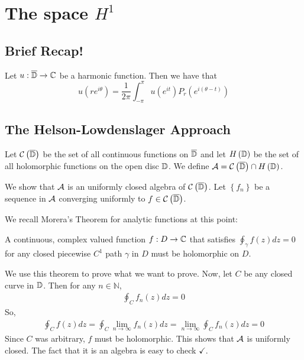 \section{The space \texorpdfstring{$H^1$}{}}
\horz

\subsection{Brief Recap!}
\begin{theorem}
    Let $u : \overline{\mathbb D} \to \mathbb C$ be a harmonic function. Then we have that
    \begin{equation*}
	u\left( re^{i\theta} \right) = \frac{1}{2\pi} \int_{-\pi}^{\pi} u\left( e^{it} \right) P_{r} \left( e^{i\left( \theta-t \right)} \right)
    \end{equation*}
    \label{thm:Poisson-Integral-Formula}
\end{theorem}

\subsection{The Helson-Lowdenslager Approach}
Let ${\cal C} \left( \overline {\mathbb D} \right)$ be the set of all continuous functions on $\overline{\mathbb D}$ and let $H\left( \mathbb D \right)$ be the set of all holomorphic functions on the open disc $\mathbb D$. We define ${\cal A} ={\cal C} \left( \overline{ \mathbb D } \right) \cap H \left( \mathbb D \right)$.

We show that ${\cal A}$ is an uniformly closed algebra of ${\cal C} \left( \overline{ \mathbb D } \right)$. Let $\left\{ f_{n} \right\}$ be a sequence in ${\cal A}$ converging uniformly to $f\in {\cal C} \left( \overline {\mathbb D} \right)$.

We recall Morera's Theorem for analytic functions at this point:
\begin{theorem}[Morera]
    A continuous, complex valued function $f : D \to \mathbb C$ that satisfies $\oint _{\gamma} f \left( z \right) dz = 0$ for any closed piecewise $C^{1}$ path $\gamma$ in $D$ must be holomorphic on $D$.
    \label{thm:morera-analytic}
\end{theorem}

We use this theorem to prove what we want to prove. Now, let $C$ be any closed curve in $\mathbb D$. Then for any $n\in \mathbb N$,
\begin{align*}
\oint_{C}f_{n}  \left( z \right) dz = 0
\end{align*}
So, 
\begin{align*}
    \oint_{C} f(z) dz = \oint_{C} \lim_{n\to \infty} f_{n} \left( z \right) dz = \lim_{n\to \infty} \oint_{C} f_{n} \left( z \right) dz =0
\end{align*}
Since $C$ was arbitrary, $f$ must be holomorphic. This shows that ${\cal A}$ is uniformly closed. The fact that it is an algebra is easy to check $\checkmark$.

